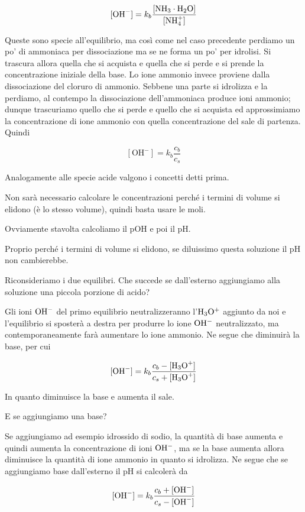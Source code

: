 $$[\text{OH}^-] = k_b \rm{\frac{[NH_3 \cdot H_2O]}{[NH_4^+]}}$$

Queste sono specie all'equilibrio, ma così come nel caso precedente perdiamo un po' di ammoniaca per dissociazione ma se ne forma un po' per idrolisi. Si trascura allora quella che si acquista e quella che si perde e si prende la concentrazione iniziale della base. Lo ione ammonio invece proviene dalla dissociazione del cloruro di ammonio. Sebbene una parte si idrolizza e la perdiamo, al contempo la dissociazione dell'ammoniaca produce ioni ammonio; dunque trascuriamo quello che si perde e quello che si acquista ed approssimiamo la concentrazione di ione ammonio con quella concentrazione del sale di partenza. Quindi

$$[\text{OH}^-] = k_b \frac{c_b}{c_s}$$

Analogamente alle specie acide valgono i concetti detti prima.

Non sarà necessario calcolare le concentrazioni perché i termini di volume si elidono (è lo stesso volume), quindi basta usare le moli.

Ovviamente stavolta calcoliamo il pOH e poi il pH.

Proprio perché i termini di volume si elidono, se diluissimo questa soluzione il pH non cambierebbe.

\vspace{0.2cm}Riconsideriamo i due equilibri. Che succede se dall'esterno aggiungiamo alla soluzione una piccola porzione di acido?

Gli ioni $\rm OH^-$ del primo equilibrio neutralizzeranno l'$\rm H_3O^+$ aggiunto da noi e l'equilibrio si sposterà a destra per produrre lo ione $\rm OH^-$ neutralizzato, ma contemporaneamente farà aumentare lo ione ammonio. Ne segue che diminuirà la base, per cui

$${[\text{OH}^-]}=k_b \frac{c_b - \rm{[\text{H}_3\text{O}^+]}}{c_s + \rm{[\text{H}_3\text{O}^+]}}$$

In quanto diminuisce la base e aumenta il sale.

E se aggiungiamo una base?

Se aggiungiamo ad esempio idrossido di sodio, la quantità di base aumenta e quindi aumenta la concentrazione di ioni $\rm OH^-$, ma se la base aumenta allora diminuisce la quantità di ione ammonio in quanto si idrolizza. Ne segue che se aggiungiamo base dall'esterno il pH si calcolerà da

$${[\text{OH}^-]}=k_b \frac{c_b + {[\text{OH}^-]}}{c_s - \rm{[\text{OH}^-]}}$$

